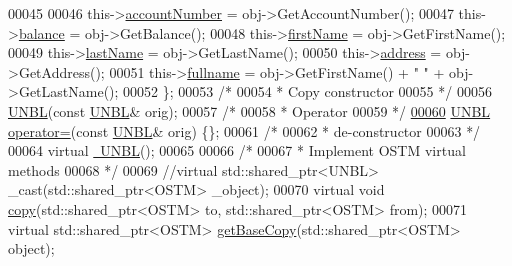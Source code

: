 \begin{DoxyCode}
00045  
00046         this->\hyperlink{class_u_n_b_l_a90763c3044159862bcb9cd51d6b09f34_a90763c3044159862bcb9cd51d6b09f34}{accountNumber} = obj->GetAccountNumber();
00047         this->\hyperlink{class_u_n_b_l_afbe674996d7fddaffb55654e6a79f03b_afbe674996d7fddaffb55654e6a79f03b}{balance} = obj->GetBalance();
00048         this->\hyperlink{class_u_n_b_l_acee1595bf1914ac220f7c810b174bd16_acee1595bf1914ac220f7c810b174bd16}{firstName} = obj->GetFirstName();
00049         this->\hyperlink{class_u_n_b_l_a3f42790177cbe310536f53a7369ee194_a3f42790177cbe310536f53a7369ee194}{lastName} = obj->GetLastName();
00050         this->\hyperlink{class_u_n_b_l_acdaf39211e9b9c190a69bbbc590543e3_acdaf39211e9b9c190a69bbbc590543e3}{address} = obj->GetAddress();
00051         this->\hyperlink{class_u_n_b_l_a67deb62f553fe1ece6feb73f12898e7a_a67deb62f553fe1ece6feb73f12898e7a}{fullname} = obj->GetFirstName() + \textcolor{stringliteral}{" "} + obj->GetLastName();
00052     \};
00053     \textcolor{comment}{/*}
00054 \textcolor{comment}{     * Copy constructor}
00055 \textcolor{comment}{     */}
00056     \hyperlink{class_u_n_b_l_aa264ef64c453e6049b3d4c984d84d1de_aa264ef64c453e6049b3d4c984d84d1de}{UNBL}(\textcolor{keyword}{const} \hyperlink{class_u_n_b_l}{UNBL}& orig);
00057     \textcolor{comment}{/*}
00058 \textcolor{comment}{     * Operator}
00059 \textcolor{comment}{     */}
\hypertarget{_u_n_b_l_8h_source.tex_l00060}{}\hyperlink{class_u_n_b_l_a32ab1105494f18bdb33e651e9bbfcd02_a32ab1105494f18bdb33e651e9bbfcd02}{00060}     \hyperlink{class_u_n_b_l}{UNBL} \hyperlink{class_u_n_b_l_a32ab1105494f18bdb33e651e9bbfcd02_a32ab1105494f18bdb33e651e9bbfcd02}{operator=}(\textcolor{keyword}{const} \hyperlink{class_u_n_b_l}{UNBL}& orig) \{\};
00061     \textcolor{comment}{/*}
00062 \textcolor{comment}{     * de-constructor}
00063 \textcolor{comment}{     */}
00064     \textcolor{keyword}{virtual} \hyperlink{class_u_n_b_l_a32d405e6e9adfab1ffdeec6406f9e72f_a32d405e6e9adfab1ffdeec6406f9e72f}{~UNBL}();
00065     
00066     \textcolor{comment}{/*}
00067 \textcolor{comment}{     * Implement OSTM virtual methods}
00068 \textcolor{comment}{     */}
00069     \textcolor{comment}{//virtual std::shared\_ptr<UNBL> \_cast(std::shared\_ptr<OSTM> \_object);}
00070     \textcolor{keyword}{virtual} \textcolor{keywordtype}{void} \hyperlink{class_u_n_b_l_a14d5e1adc618827667d8d9524abaf31b_a14d5e1adc618827667d8d9524abaf31b}{copy}(std::shared\_ptr<OSTM> to, std::shared\_ptr<OSTM> from);
00071     \textcolor{keyword}{virtual} std::shared\_ptr<OSTM> \hyperlink{class_u_n_b_l_a5dfe7f9e5fbb66abff9a73e40e803887_a5dfe7f9e5fbb66abff9a73e40e803887}{getBaseCopy}(std::shared\_ptr<OSTM> \textcolor{keywordtype}{object});

\end{DoxyCode}
